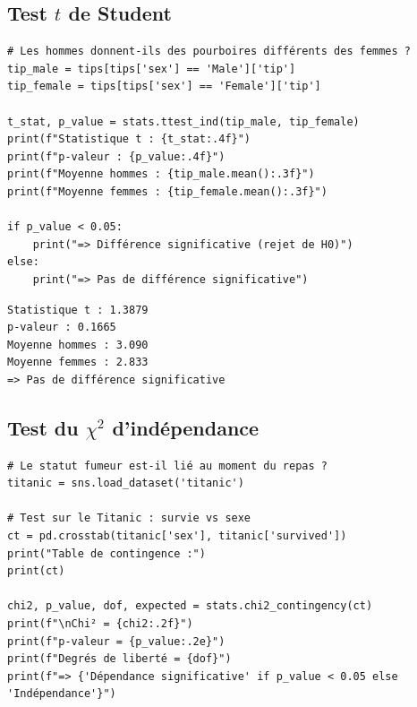 \subsection{Test $t$ de Student}

\begin{codeblock}[title=\textbf{Python}]
\begin{verbatim}
# Les hommes donnent-ils des pourboires différents des femmes ?
tip_male = tips[tips['sex'] == 'Male']['tip']
tip_female = tips[tips['sex'] == 'Female']['tip']

t_stat, p_value = stats.ttest_ind(tip_male, tip_female)
print(f"Statistique t : {t_stat:.4f}")
print(f"p-valeur : {p_value:.4f}")
print(f"Moyenne hommes : {tip_male.mean():.3f}")
print(f"Moyenne femmes : {tip_female.mean():.3f}")

if p_value < 0.05:
    print("=> Différence significative (rejet de H0)")
else:
    print("=> Pas de différence significative")
\end{verbatim}
\end{codeblock}

\begin{codeoutput}
\begin{verbatim}
Statistique t : 1.3879
p-valeur : 0.1665
Moyenne hommes : 3.090
Moyenne femmes : 2.833
=> Pas de différence significative
\end{verbatim}
\end{codeoutput}

\subsection{Test du $\chi^2$ d'ind\'ependance}

\begin{codeblock}[title=\textbf{Python}]
\begin{verbatim}
# Le statut fumeur est-il lié au moment du repas ?
titanic = sns.load_dataset('titanic')

# Test sur le Titanic : survie vs sexe
ct = pd.crosstab(titanic['sex'], titanic['survived'])
print("Table de contingence :")
print(ct)

chi2, p_value, dof, expected = stats.chi2_contingency(ct)
print(f"\nChi² = {chi2:.2f}")
print(f"p-valeur = {p_value:.2e}")
print(f"Degrés de liberté = {dof}")
print(f"=> {'Dépendance significative' if p_value < 0.05 else 'Indépendance'}")
\end{verbatim}
\end{codeblock}

